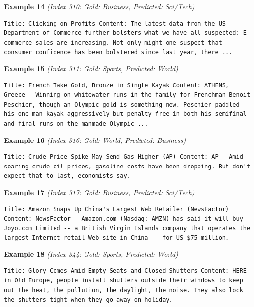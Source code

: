 \noindent
\textbf{Example 14} \quad \textit{(Index 310: Gold: Business, Predicted: Sci/Tech)}

\begin{Verbatim}[breaklines=true,breakanywhere=true,fontsize=\small]
Title: Clicking on Profits Content: The latest data from the US Department of Commerce further bolsters what we have all suspected: E-commerce sales are increasing. Not only might one suspect that consumer confidence has been bolstered since last year, there ...
\end{Verbatim}

\noindent
\textbf{Example 15} \quad \textit{(Index 311: Gold: Sports, Predicted: World)}

\begin{Verbatim}[breaklines=true,breakanywhere=true,fontsize=\small]
Title: French Take Gold, Bronze in Single Kayak Content: ATHENS, Greece - Winning on whitewater runs in the family for Frenchman Benoit Peschier, though an Olympic gold is something new. Peschier paddled his one-man kayak aggressively but penalty free in both his semifinal and final runs on the manmade Olympic ...
\end{Verbatim}

\noindent
\textbf{Example 16} \quad \textit{(Index 316: Gold: World, Predicted: Business)}

\begin{Verbatim}[breaklines=true,breakanywhere=true,fontsize=\small]
Title: Crude Price Spike May Send Gas Higher (AP) Content: AP - Amid soaring crude oil prices, gasoline costs have been dropping. But don't expect that to last, economists say.
\end{Verbatim}

\noindent
\textbf{Example 17} \quad \textit{(Index 317: Gold: Business, Predicted: Sci/Tech)}

\begin{Verbatim}[breaklines=true,breakanywhere=true,fontsize=\small]
Title: Amazon Snaps Up China's Largest Web Retailer (NewsFactor) Content: NewsFactor - Amazon.com (Nasdaq: AMZN) has said it will buy Joyo.com Limited -- a British Virgin Islands company that operates the largest Internet retail Web site in China -- for US $75 million.
\end{Verbatim}

\noindent
\textbf{Example 18} \quad \textit{(Index 344: Gold: Sports, Predicted: World)}

\begin{Verbatim}[breaklines=true,breakanywhere=true,fontsize=\small]
Title: Glory Comes Amid Empty Seats and Closed Shutters Content: HERE in Old Europe, people install shutters outside their windows to keep out the heat, the pollution, the daylight, the noise. They also lock the shutters tight when they go away on holiday.
\end{Verbatim}

